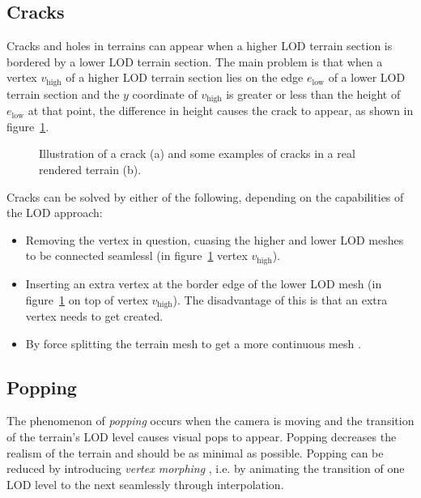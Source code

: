 \subsection{Cracks}
Cracks and holes in terrains can appear when a higher LOD terrain section is bordered 
by a lower LOD terrain section. The main problem is that when a vertex $v_{\text{high}}$ of a higher LOD terrain section lies on the edge $e_{\text{low}}$
of a lower LOD terrain section and the $y$ coordinate of $v_{\text{high}}$ is greater or less than the 
height of $e_{\text{low}}$ at that point, the difference in height causes the crack to appear, as shown in figure~\ref{fig:crack-example}.
\begin{figure}[H]
  \centering
  \qquad
  \caption{Illustration of a crack (a) and some examples of cracks in a real rendered terrain (b).}\label{fig:crack-example}
\end{figure}
Cracks can be solved by either of the following, depending on the capabilities of the LOD approach:
\begin{itemize}
  \item Removing the vertex in question, cuasing the higher and lower LOD meshes to be connected seamlessl (in figure~\ref{fig:crack-example} vertex $v_{\text{high}}$).
  \item Inserting an extra vertex at the border edge of the lower LOD mesh \cite[p.~194]{lodfor3dgraphics} (in figure~\ref{fig:crack-example} on top of vertex $v_{\text{high}}$). The disadvantage of this is that an extra vertex needs to get created.
  \item By force splitting the terrain mesh to get a more continuous mesh \cite[p.~193]{lodfor3dgraphics}. 
\end{itemize}

\subsection{Popping}
The phenomenon of \textit{popping} occurs when the camera is moving 
and the transition of the terrain's LOD level causes visual pops to appear.
Popping decreases the realism of the terrain and should be as minimal as possible.
Popping can be reduced by introducing \textit{vertex morphing} \cite{geomipmapping,geomclipmaps,cdlod}, 
i.e. by animating the transition of one LOD level to the next seamlessly through interpolation.
